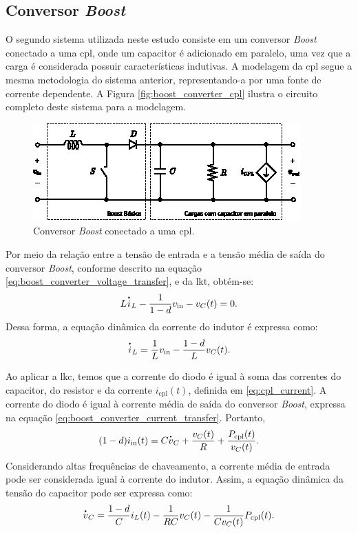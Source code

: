 \subsection{Conversor \textit{Boost}}

O segundo sistema utilizada neste estudo consiste em um conversor \textit{Boost} conectado a uma \acrshort{cpl}, onde um capacitor é adicionado em paralelo, uma vez que a carga é considerada possuir características indutivas. A modelagem da \acrshort{cpl} segue a mesma metodologia do sistema anterior, representando-a por uma fonte de corrente dependente. A Figura \autoref{fig:boost_converter_cpl} ilustra o circuito completo deste sistema para a modelagem.

\begin{figure}[H]
  \centering
  \includegraphics[width=.73\textwidth]{figuras/boost_converter_cpl.eps}
  \caption{Conversor \textit{Boost} conectado a uma \acrshort{cpl}.}
  \label{fig:boost_converter_cpl}
\end{figure}

Por meio da relação entre a tensão de entrada e a tensão média de saída do conversor \textit{Boost}, conforme descrito na equação \eqref{eq:boost_converter_voltage_transfer}, e da \acrshort{lkt}, obtém-se: \begin{equation} L \dt{i}_L - \frac{1}{1-d} v_{\mathrm{in}} - v_C(t) = 0. \end{equation} Dessa forma, a equação dinâmica da corrente do indutor é expressa como: \begin{equation} \dt{i}_L = \frac{1}{L}v_{\mathrm{in}} - \frac{1-d}{L}v_C(t) \label{eq:boost_converter_current}. \end{equation}

Ao aplicar a \acrshort{lkc}, temos que a corrente do diodo é igual à soma das correntes do capacitor, do resistor e da corrente $i_{\mathrm{cpl}}(t)$, definida em \eqref{eq:cpl_current}. A corrente do diodo é igual à corrente média de saída do conversor \textit{Boost}, expressa na equação \eqref{eq:boost_converter_current_transfer}. Portanto, \begin{equation} (1 - d) i_{\mathrm{in}}(t) = C\dt{v}_C + \frac{v_C(t)}{R} + \frac{P_{\mathrm{cpl}}(t)}{v_C(t)}.\end{equation} Considerando altas frequências de chaveamento, a corrente média de entrada pode ser considerada igual à corrente do indutor. Assim, a equação dinâmica da tensão do capacitor pode ser expressa como: \begin{equation} \dt{v}_C = \frac{1 - d}{C} i_L(t) - \frac{1}{RC}v_C(t) - \frac{1}{Cv_C(t)}P_{\mathrm{cpl}}(t). \label{eq:boost_converter_voltage}\end{equation}

